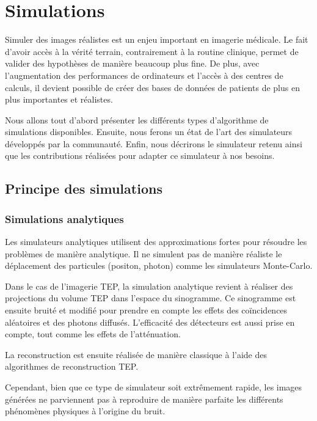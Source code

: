 \chapter{Simulations}

Simuler des images réalistes est un enjeu important en imagerie médicale. Le fait d'avoir accès à la vérité terrain, contrairement à la routine clinique, permet de valider des hypothèses de manière beaucoup plus fine. De plus, avec l'augmentation des performances de ordinateurs et l'accès à des centres de calculs, il devient possible de créer des bases de données de patients de plus en plus importantes et réalistes.

Nous allons tout d'abord présenter les différents types d'algorithme de simulations disponibles. Ensuite, nous ferons un état de l'art des simulateurs développés par la communauté. Enfin, nous décrirons le simulateur retenu ainsi que les contributions réalisées pour adapter ce simulateur à nos besoins.

	\section{Principe des simulations}

		\subsection{Simulations analytiques}

Les simulateurs analytiques utilisent des approximations fortes pour résoudre les problèmes de manière analytique. Il ne simulent pas de manière réaliste le déplacement des particules (positon, photon) comme les simulateurs Monte-Carlo.

Dans le cas de l'imagerie TEP, la simulation analytique revient à réaliser des projections du volume TEP dans l'espace du sinogramme. Ce sinogramme est ensuite bruité et modifié pour prendre en compte les effets des coïncidences aléatoires et des photons diffusés. L'efficacité des détecteurs est aussi prise en compte, tout comme les effets de l'atténuation. 

La reconstruction est ensuite réalisée de manière classique à l'aide des algorithmes de reconstruction TEP.


Cependant, bien que ce type de simulateur soit extrêmement rapide, les images générées ne parviennent pas à reproduire de manière parfaite les différents phénomènes physiques à l'origine du bruit.




